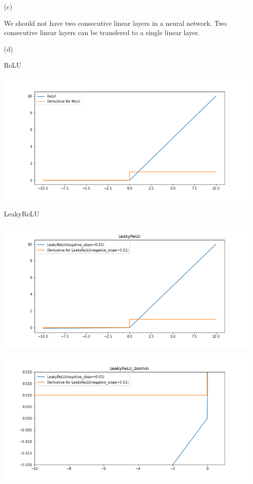 (c)

We should not have two consecutive linear layers in a neural network. Two consecutive linear layers can be transfered to a single linear layer.


(d)


ReLU 

\includegraphics[width=\linewidth]{./imgs/relu.png}

LeakyReLU

\includegraphics[width=\linewidth]{./imgs/leakyrelu.png}


\includegraphics[width=\linewidth]{./imgs/leakyrelu_zoomin.png}

